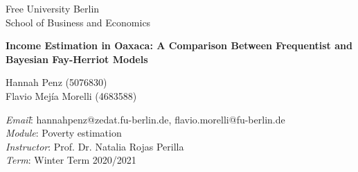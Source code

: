 \thispagestyle{empty}

\begin{center}

\vspace*{19mm}

{\LARGE Free University Berlin}\\
{\LARGE School of Business and Economics\\}



\vspace*{4cm}



\vspace{1cm}

{\Large\textbf{Income Estimation in Oaxaca: A Comparison Between Frequentist and Bayesian Fay-Herriot Models}}\\ [2mm]

\vspace*{1mm}

\vspace{2.5cm}

{\Large Hannah Penz (5076830) \\ Flavio Mejía Morelli (4683588)}\\[3mm]



\vspace{2cm}
\parbox{120mm}{
\begin{large}
\begin{tabbing}

\textit{Email}:\= \hspace{0.5cm} hannahpenz@zedat.fu-berlin.de, flavio.morelli@fu-berlin.de\\
\textit{Module}:\> \hspace{0.5cm} Poverty estimation\\
\textit{Instructor}:\> \hspace{1 cm} Prof. Dr. Natalia Rojas Perilla\\
\textit{Term}:\> Winter Term 2020/2021\\


\end{tabbing}
\end{large}}
\end{center}
